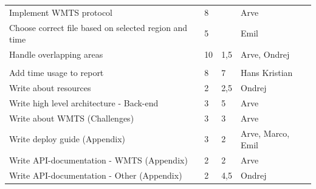 \documentclass[11pt,a4paper,titlepage,oneside]{report}
\begin{document}
\begin{table}[h]
{\begin{tabular}{llll}
Implement WMTS protocol                                & 8                                                                   &                                                         & Arve                       \\
Choose correct file based on selected region and time  & 5                                                                   &                                                         & Emil                       \\
Handle overlapping areas                               & 10                                                                  & 1,5                                                     & Arve, Ondrej               \\
\rowcolor[HTML]{C0C0C0} 
\multicolumn{4}{l}{\cellcolor[HTML]{C0C0C0}\textbf{Reporting}}                                                                                                                                                      \\
Add time usage to report                               & 8                                                                   & 7                                                       & Hans Kristian              \\
Write about resources                                  & 2                                                                   & 2,5                                                     & Ondrej                     \\
Write high level architecture - Back-end               & 3                                                                   & 5                                                       & Arve                       \\
Write about WMTS (Challenges)                          & 3                                                                   & 3                                                       & Arve                       \\
Write deploy guide (Appendix)                          & 3                                                                   & 2                                                       & Arve, Marco, Emil          \\
Write API-documentation - WMTS (Appendix)              & 2                                                                   & 2                                                       & Arve                       \\
Write API-documentation - Other (Appendix)             & 2                                                                   & 4,5                                                     & Ondrej                     \\

\end{tabular}}
\end{table}
\end{document}
